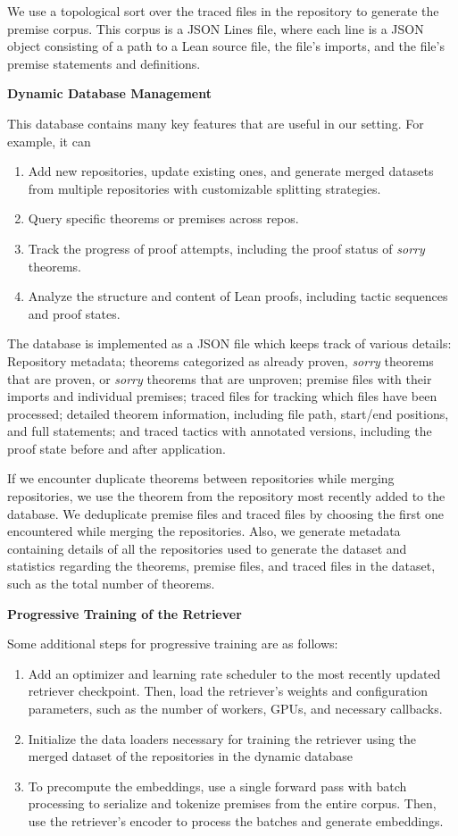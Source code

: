 \documentclass{article} %
\begin{document}
We use a topological sort over the traced files in the repository to generate the premise corpus. This corpus is a JSON Lines file, where each line is a JSON object consisting of a path to a Lean source file, the file's imports, and the file's premise statements and definitions.

\textbf{Dynamic Database Management}

This database contains many key features that are useful in our setting. For example, it can
\begin{enumerate}
    \item Add new repositories, update existing ones, and generate merged datasets from multiple repositories with customizable splitting strategies.
    \item Query specific theorems or premises across repos.
    \item Track the progress of proof attempts, including the proof status of \textit{sorry} theorems.
    \item Analyze the structure and content of Lean proofs, including tactic sequences and proof states.
\end{enumerate}

The database is implemented as a JSON file which keeps track of various details: Repository metadata; theorems categorized as already proven, \textit{sorry} theorems that are proven, or \textit{sorry} theorems that are unproven; premise files with their imports and individual premises; traced files for tracking which files have been processed; detailed theorem information, including file path, start/end positions, and full statements; and traced tactics with annotated versions, including the proof state before and after application.

If we encounter duplicate theorems between repositories while merging repositories, we use the theorem from the repository most recently added to the database. We deduplicate premise files and traced files by choosing the first one encountered while merging the repositories. Also, we generate metadata containing details of all the repositories used to generate the dataset and statistics regarding the theorems, premise files, and traced files in the dataset, such as the total number of theorems.

\textbf{Progressive Training of the Retriever}

Some additional steps for progressive training are as follows:
\begin{enumerate}
    \item Add an optimizer and learning rate scheduler to the most recently updated retriever checkpoint. Then, load the retriever's weights and configuration parameters, such as the number of workers, GPUs, and necessary callbacks.
    \item Initialize the data loaders necessary for training the retriever using the merged dataset of the repositories in the dynamic database
    \item To precompute the embeddings, use a single forward pass with batch processing to serialize and tokenize premises from the entire corpus. Then, use the retriever's encoder to process the batches and generate embeddings.
\end{enumerate}
\end{document}
